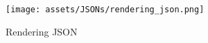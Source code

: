 \begin{figure}[t!]
    \centering
    \noindent
    \texttt{[image: assets/JSONs/rendering\_json.png]}
    \caption{Rendering JSON}
    \label{fig:rendering_json_example}
\end{figure}